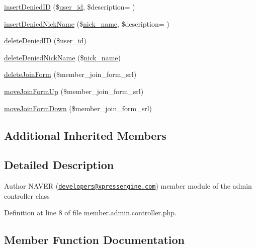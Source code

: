\begin{DoxyCompactItemize}
\item 
\hyperlink{classmemberAdminController_ac60bb370f5cac395c99b05723ece5ccb}{insert\+Denied\+I\+D} (\$\hyperlink{ko_8install_8php_a74f1a394389d774e5b4cd5d1d15413f7}{user\+\_\+id}, \$description= \textquotesingle{}\textquotesingle{})
\item 
\hyperlink{classmemberAdminController_af3b39a52edd371b5dd5071987f25ed64}{insert\+Denied\+Nick\+Name} (\$\hyperlink{ko_8install_8php_a151ecae87a1f3d7e257aa089803086bd}{nick\+\_\+name}, \$description= \textquotesingle{}\textquotesingle{})
\item 
\hyperlink{classmemberAdminController_af7f02615adb1cbd7b8b91a330bda1a38}{delete\+Denied\+I\+D} (\$\hyperlink{ko_8install_8php_a74f1a394389d774e5b4cd5d1d15413f7}{user\+\_\+id})
\item 
\hyperlink{classmemberAdminController_a20792ed4ccef3abf09eb3fbd5dd955fb}{delete\+Denied\+Nick\+Name} (\$\hyperlink{ko_8install_8php_a151ecae87a1f3d7e257aa089803086bd}{nick\+\_\+name})
\item 
\hyperlink{classmemberAdminController_a3fbfbbc1a77c7aaaed901e08fd2ec09c}{delete\+Join\+Form} (\$member\+\_\+join\+\_\+form\+\_\+srl)
\item 
\hyperlink{classmemberAdminController_a6ab62c7dab973a7dc4d12b7739d82660}{move\+Join\+Form\+Up} (\$member\+\_\+join\+\_\+form\+\_\+srl)
\item 
\hyperlink{classmemberAdminController_a07d6306d7ed6eadca11fdc8ca9eb10d4}{move\+Join\+Form\+Down} (\$member\+\_\+join\+\_\+form\+\_\+srl)
\end{DoxyCompactItemize}
\subsection*{Additional Inherited Members}


\subsection{Detailed Description}
\begin{DoxyAuthor}{Author}
N\+A\+V\+E\+R (\href{mailto:developers@xpressengine.com}{\tt developers@xpressengine.\+com}) member module of the admin controller class 
\end{DoxyAuthor}


Definition at line 8 of file member.\+admin.\+controller.\+php.



\subsection{Member Function Documentation}
\hypertarget{classmemberAdminController_a6e227f85ce71ac94e57e37ecc395613f}{}
